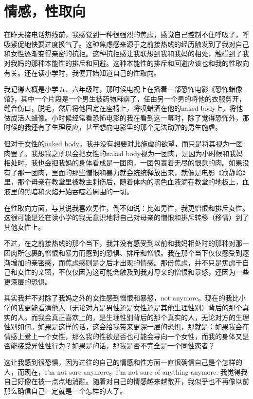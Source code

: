 \chapter{情感，性取向}



在昨天接电话热线前，我感觉到一种很强烈的焦虑，感觉自己控制不住呼吸了，呼吸紧促地快要过度换气了。这种焦虑感来源于之前接热线的经历触发到了我对自己和女性逐渐变得亲密的抗拒。这种抗拒感让我联想到我和我妈的相处，触碰到了我对我妈的那种本能性的排斥和回避。这种本能性的排斥和回避应该也和我的性取向有关。还在读小学时，我便开始知道自己的性取向。

我记得大概是小学五、六年级时，那时候电视上在播着一部恐怖电影《恐怖蜡像馆》，其中一个片段是一个男生被药物麻痹了，任由另一个男的将他的衣服剪开，缝合伤口，脱毛，然后将他固定在座椅上，将喷蜡洒在他的naked body上，将他做成活人蜡像。小时候经常看恐怖电影的我在看到这一幕时，除了觉得恐怖外，那时候的我还有了生理反应，甚至想向电影里的那个无法动弹的男生施虐。

但对于女性的naked body，我并没有想要对此施虐的欲望，而只是将其视为一团肉罢了。我想我之所以会把女性的naked body视为一团肉，是因为小时候和我妈相处时，我也会把我妈的身体看成是一团肉，一团包裹着无尽的恨意的肉。如果没有了那一团肉，里面的那些憎恨和暴力就会统统释放出来，就像是电影《寂静岭》里，那个母亲在教堂里被教主刺伤后，随着体内的黑色血液滴在教堂的地板上，血液里的黑暗和火焰开始吞噬着周围的一切。

在性取向方面，与其说我喜欢男性，倒不如说：比如男性，我更憎恨和排斥女性。这很可能是还在读小学的我无意识地将自己对母亲的憎恨和排斥转移（移情）到了其他女性上。

不过，在之前接热线的那个当下，我并没有感受到以前和我妈相处时的那种对那一团肉所包裹的憎恨和暴力而感到的恐惧、排斥和憎恨。我在那个当下仅仅感受到逐渐增加的亲密感，而焦虑感则是之后才出现的情感。那份焦虑，并不只是焦虑于自己和女性的亲密，不仅仅因为这可能会触及到我对母亲的憎恨和暴怒，还因为一些更深层的恐惧。

其实我并不对除了我妈之外的女性感到憎恨和暴怒，not anymore。现在的我比小学的我更能看清他人（无论对方是男性还是女性还是其他生理性别）背后的那个真实的人。而我会真正喜欢上的，是生理性别背后的那个真实的人，无论对方的生理性别如何。如果是这样的话，这会给我带来更深一层的恐惧，那就是：如果我会在情感上爱上一个女性，那么我的性欲是否也可能会导向一个女性，而我的身体又是否能接受异性性行为？如果是的话，那我是否不完全是一个同性恋者？

这让我感到很恐惧，因为过往的自己的情感和性方面一直很确信自己是个怎样的人，而现在，I'm not sure anymore。I'm not sure of anything anymore. 我觉得我自己好像在被一点点地消融。随着对自己的情感越来越敞开，我似乎也不再像以前那么确信自己一定就是一个怎样的人了。
